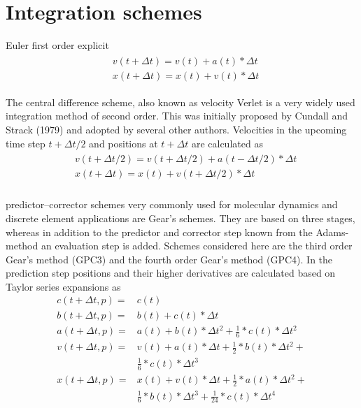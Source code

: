 \section*{Integration schemes}
Euler first order explicit
\begin{align}\label{eqn:euler}
    \begin{split}
        &v(t+\Delta{t}) = v(t) + a(t) * \Delta{t}\\
        &x(t+\Delta{t}) = x(t) + v(t) * \Delta{t}
    \end{split}
\end{align}
\par
The central difference scheme, also known as velocity Verlet is a very widely
used integration method of second order. This was initially proposed by Cundall
and Strack (1979) and adopted by several other authors. Velocities in the
upcoming time step $t + \Delta{t}/2 $ and positions at $t + \Delta{t}$ are
calculated as
\begin{align}\label{eqn:verlet}
    \begin{split}
        &v(t + \Delta{t}/2) = v(t + \Delta{t}/2) +a(t - \Delta{t}/2) * \Delta{t}\\
        &x(t + \Delta{t}) = x(t) +v(t + \Delta{t}/2) * \Delta{t}\\
    \end{split}
\end{align}
\par
predictor–corrector schemes very commonly used for molecular dynamics and
discrete element applications are Gear’s schemes. They are based on three
stages, whereas in addition to the predictor and corrector step known from the
Adams-method an evaluation step is added. Schemes considered here are the third
order Gear’s method (GPC3) and the fourth order Gear’s method (GPC4). In the
prediction step positions and their higher derivatives are calculated based on
Taylor series expansions as
\begin{equation}\label{eqn:gearP}
    \begin{split}
        c(t+\Delta{t}, p) =& c(t)\\
        b(t+\Delta{t}, p) =& b(t) + c(t) *\Delta{t}\\
        a(t+\Delta{t}, p) =& a(t) + b(t) *\Delta{t}^2 + \frac{1}{6} * c(t) *\Delta{t}^2\\
        v(t+\Delta{t}, p) =& v(t) + a(t) *\Delta{t} + \frac{1}{2} * b(t) *\Delta{t}^2 +\\
        &\frac{1}{6} * c(t) *\Delta{t}^3\\
        x(t+\Delta{t}, p) =& x(t) + v(t) * \Delta{t} + \frac{1}{2} * a(t) *\Delta{t}^2 +\\
        &\frac{1}{6} * b(t) *\Delta{t}^3 + \frac{1}{24} * c(t) *\Delta{t}^4\\
    \end{split}
\end{equation}

